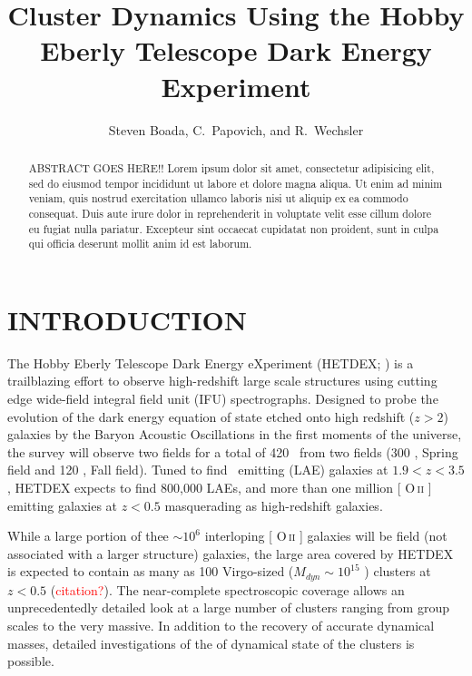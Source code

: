 \documentclass[apj, revtex4]{emulateapj}
\makeatletter
\newcommand{\editorial}[1]{\textcolor{red}{#1}}
\DeclareRobustCommand{\ion}[2]{%
\relax\ifmmode
\ifx\testbx\f@series
{\mathbf{#1\,\mathsc{#2}}}\else
{\mathrm{#1\,\mathsc{#2}}}\fi
\else\textup{#1\,{\mdseries\textsc{#2}}}%
\fi}
\makeatother
\begin{document}
\title{Cluster Dynamics Using the Hobby Eberly Telescope Dark Energy Experiment}

\author{\sc Steven Boada, 
C.~Papovich, and
R.~Wechsler} 


\begin{abstract}
\noindent
ABSTRACT GOES HERE!!
Lorem ipsum dolor sit amet, consectetur adipisicing elit, sed do eiusmod tempor incididunt ut labore et dolore magna aliqua. Ut enim ad minim veniam, quis nostrud exercitation ullamco laboris nisi ut aliquip ex ea commodo consequat. Duis aute irure dolor in reprehenderit in voluptate velit esse cillum dolore eu fugiat nulla pariatur. Excepteur sint occaecat cupidatat non proident, sunt in culpa qui officia deserunt mollit anim id est laborum.
\end{abstract}

\section{INTRODUCTION}
The Hobby Eberly Telescope Dark Energy eXperiment (HETDEX; \citealt{Hill2008}) is a trailblazing effort to observe high-redshift large scale structures using cutting edge wide-field integral field unit (IFU) spectrographs. Designed to probe the evolution of the dark energy equation of state etched onto high redshift ($z>2$) galaxies by the Baryon Acoustic Oscillations \citep{Eisenstein2005} in the first moments of the universe, the survey will observe two fields for a total of 420 \degsq\ from two fields (300 \degsq, Spring field and 120 \degsq, Fall field). Tuned to find \lya\ emitting (LAE) galaxies at $1.9<z<3.5$, HETDEX expects to find 800,000 LAEs, and more than one million [\ion{O}{ii}] emitting galaxies at $z<0.5$ masquerading as high-redshift galaxies.  

While a large portion of thee $\sim10^6$ interloping [\ion{O}{ii}] galaxies will be field (not associated with a larger structure) galaxies, the large area covered by HETDEX is expected to contain as many as 100 Virgo-sized ($M_{dyn}\sim 10^{15}$ \msol) clusters at $z<0.5$ (\editorial{citation?}). The near-complete spectroscopic coverage allows an unprecedentedly detailed look at a large number of clusters ranging from group scales to the very massive. In addition to the recovery of accurate dynamical masses, detailed investigations of the of dynamical state of the clusters is possible. 
\end{document}
